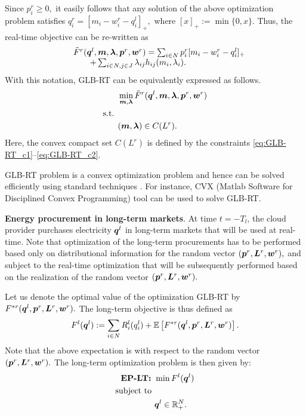 Since $p^r_i \geq 0,$ it easily follows that any solution of the above optimization problem satisfies $q^r_i =[m_i - w^r_i - q^l_i]_+,$ where $[x]_+ := \min\{0,x\}.$ Thus, the real-time objective can be re-written as 
\begin{equation}
\label{eq:rt-obj2}
\begin{array}{rl}
&\tilde{F}^r(\boldsymbol{q}^l,\boldsymbol{m},\boldsymbol{\lambda},\boldsymbol{p}^r,\boldsymbol{w}^r) = \sum_{i \in N} p^r_i [m_i - w^r_i - q^l_i]_+ \\
& \qquad+ \sum_{i\in N, j \in J}
\lambda_{ij}h_{ij}(m_i,\lambda_i).    
\end{array}
\end{equation}
With this notation, GLB-RT can be equivalently expressed as follows.
\begin{subequations}
	\begin{align*}
	& \min_{\boldsymbol{m}, \boldsymbol{\lambda}} \tilde{F}^r(\boldsymbol{q}^l,\boldsymbol{m},\boldsymbol{\lambda},\boldsymbol{p}^r,\boldsymbol{w}^r) \\
	\mbox{s.t. } \nonumber \\
	&(\boldsymbol{m},\boldsymbol{\lambda}) \in C(L^r).
	\end{align*}
\end{subequations}
Here, the convex compact set $C(L^r)$ is defined by the constraints
\eqref{eq:GLB-RT_c1}--\eqref{eq:GLB-RT_c2}.


GLB-RT problem is a convex optimization problem and hence can be solved efficiently using standard techniques \cite{boyd2004convex}. For instance, CVX (Matlab Software for Disciplined Convex Programming) tool \cite{grant2008cvx} can be used to solve GLB-RT. 


\textbf{Energy procurement in long-term markets}. At time $t=-T_l$,
the cloud provider purchases electricity $\boldsymbol{q}^l$ in
long-term markets that will be used at real-time. Note that
optimization of the long-term procurements has to be performed based
only on distributional information for the random vector
$(\boldsymbol{p}^r,\boldsymbol{L}^r,\boldsymbol{w}^r),$ and subject to the
real-time optimization that will be subsequently performed based on
the realization of the random vector
$(\boldsymbol{p}^r,\boldsymbol{L}^r,\boldsymbol{w}^r).$ 

Let us denote the optimal value of the optimization GLB-RT by
$F^{*r}(\boldsymbol{q}^l,\boldsymbol{p}^r, \boldsymbol{L}^r, \boldsymbol{w}^r).$ The
long-term objective is thus defined as $$F^l(\boldsymbol{q}^l) :=
\sum_{i\in N} R^l_i(q^l_i) + \mathbb{E}\left[F^{*r}(\boldsymbol{q}^l,\boldsymbol{p}^r,
	\boldsymbol{L}^r, \boldsymbol{w}^r)\right].$$ Note that the above expectation is
with respect to the random vector
$(\boldsymbol{p}^r,\boldsymbol{L}^r,\boldsymbol{w}^r).$ The long-term optimization
problem is then given by:
\begin{subequations}
	\begin{align*}
	\text{\bf{EP-LT}: }  & \min F^l(\boldsymbol{q}^l) \\
	\mbox{subject to } \nonumber \\
	& \boldsymbol{q}^l \in \mathbb{R}^N_+.
	\end{align*}
\end{subequations}

